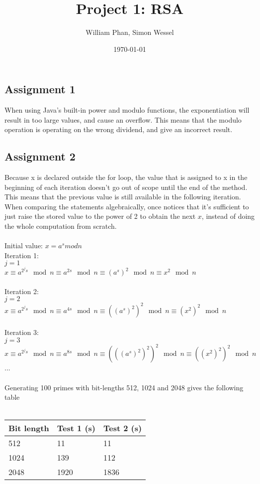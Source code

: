 \documentclass[11pt,a4paper]{article}
\title{Project 1: RSA} %
\author{William Phan, Simon Wessel}
\date{\today} %
\begin{document}
\maketitle %

\setcounter{secnumdepth}{0}

\subsection{Assignment 1}
When using Java's built-in power and modulo functions, the exponentiation will result in too large values, and cause an overflow. This means that the modulo operation is operating on the wrong dividend, and give an incorrect result.

\subsection{Assignment 2}
Because x is declared outside the for loop, the value that is assigned to x in the beginning of each iteration doesn't go out of scope until the end of the method. This means that the previous value is still available in the following iteration. When comparing the statements algebraically, once notices that it's sufficient to just raise the stored value to the power of 2 to obtain the next $x$, instead of doing the whole computation from scratch.
\\\\
Initial value: $x = a^s mod n$ \\
Iteration 1: \\
$j = 1$ \\
$x \equiv a^{ 2^j s } \mod n \equiv a^{ 2s } \mod n \equiv (a^s)^2 \mod n \equiv x^2 \mod n$ \\\\
Iteration 2: \\
$j = 2$ \\
$x \equiv a^{ 2^j s } \mod n \equiv a^{ 4s } \mod n \equiv ((a^s)^2)^2 \mod n \equiv (x^2)^2 \mod n$ \\\\
Iteration 3: \\
$j = 3$ \\
$x \equiv a^{ 2^j s } \mod n \equiv a^{ 8s } \mod n \equiv (((a^s)^2)^2)^2 \mod n \equiv ((x^2)^2)^2 \mod n$ \\
...
\\\\
Generating 100 primes with bit-lengths 512, 1024 and 2048 gives the following table \\\\
\begin{tabular}{ l | l | l }
	Bit length & Test 1 (s) & Test 2 (s)\\ \hline
	512 & 11 & 11\\
	1024 & 139 & 112\\
	2048 & 1920 & 1836\\
\end{tabular}
\\\\
\end{document}
